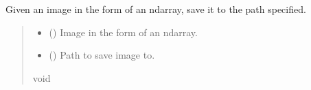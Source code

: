 \documentclass[letterpaper,10pt,english]{sphinxmanual}
\begin{document}
\begin{fulllineitems}
\begin{fulllineitems}
\begin{quote}
\begin{description}
\end{description}\end{quote}

\end{fulllineitems}


\begin{fulllineitems}
\label{\detokenize{comp_viz.utils:comp_viz.utils.toolbox.Tools.resize_image}}
\pysigstartsignatures
{}
\pysigstopsignatures
\end{fulllineitems}


\begin{fulllineitems}
\label{\detokenize{comp_viz.utils:comp_viz.utils.toolbox.Tools.save_image}}
\pysigstartsignatures
{}
\pysigstopsignatures
\sphinxAtStartPar
Given an image in the form of an ndarray, save it to the path specified.
\begin{quote}\begin{description}
\begin{itemize}
\item {} 
\sphinxAtStartPar
{} () \textendash{} Image in the form of an ndarray.

\item {} 
\sphinxAtStartPar
{} () \textendash{} Path to save image to.

\end{itemize}

\sphinxAtStartPar
void

\end{description}\end{quote}


\end{fulllineitems}
\end{fulllineitems}
\end{document}
